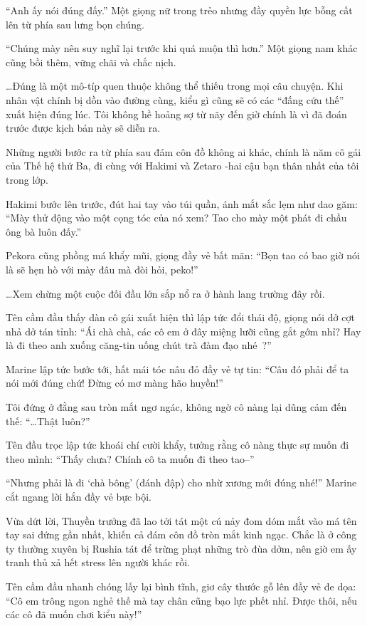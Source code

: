 \documentclass[../main.tex]{subfiles}
\begin{document}
``Anh ấy nói đúng đấy.'' Một giọng nữ trong trẻo nhưng đầy quyền lực bỗng cất lên từ phía sau lưng bọn chúng.

``Chúng mày nên suy nghĩ lại trước khi quá muộn thì hơn.'' Một giọng nam khác cũng bồi thêm, vững chãi và chắc nịch.

\dots Đúng là một mô-típ quen thuộc không thể thiếu trong mọi câu chuyện. Khi nhân vật chính bị dồn vào đường cùng, kiểu gì cũng sẽ có các ``đấng cứu thế'' xuất hiện đúng lúc. Tôi không hề hoảng sợ từ nãy đến giờ chính là vì đã đoán trước được kịch bản này sẽ diễn ra.

Những người bước ra từ phía sau đám côn đồ không ai khác, chính là năm cô gái của Thế hệ thứ Ba, đi cùng với Hakimi và Zetaro -hai cậu bạn thân nhất của tôi trong lớp.

Hakimi bước lên trước, đút hai tay vào túi quần, ánh mắt sắc lẹm như dao găm: ``Mày thử động vào một cọng tóc của nó xem? Tao cho mày một phát đi chầu ông bà luôn đấy.''

Pekora cũng phồng má khẩy mũi, giọng đầy vẻ bất mãn: ``Bọn tao có bao giờ nói là sẽ hẹn hò với mày đâu mà đòi hỏi, peko!''

\dots Xem chừng một cuộc đối đầu lớn sắp nổ ra ở hành lang trường đây rồi.

Tên cầm đầu thấy dàn cô gái xuất hiện thì lập tức đổi thái độ, giọng nói dở cợt nhả dở tán tỉnh: ``Ái chà chà, các cô em ở đây miệng lưỡi cũng gắt gớm nhỉ? Hay là đi theo anh xuống căng-tin uống chút trà đàm đạo nhé~?''

Marine lập tức bước tới, hất mái tóc nâu đỏ đầy vẻ tự tin: ``Câu đó phải để ta nói mới đúng chứ! Đừng có mơ màng hão huyền!''

Tôi đứng ở đằng sau tròn mắt ngơ ngác, không ngờ cô nàng lại dũng cảm đến thế: ``\dots Thật luôn?''

Tên đầu trọc lập tức khoái chí cười khẩy, tưởng rằng cô nàng thực sự muốn đi theo mình: ``Thấy chưa? Chính cô ta muốn đi theo tao--''

``Nhưng phải là đi `chà bông' (đánh đập) cho nhừ xương mới đúng nhé!'' Marine cắt ngang lời hắn đầy vẻ bực bội.

Vừa dứt lời, Thuyền trưởng đã lao tới tát một cú nảy đom dóm mắt vào má tên tay sai đứng gần nhất, khiến cả đám côn đồ tròn mắt kinh ngạc. Chắc là ở công ty thường xuyên bị Rushia tát để trừng phạt những trò đùa dởm, nên giờ em ấy tranh thủ xả hết stress lên người khác rồi.

Tên cầm đầu nhanh chóng lấy lại bình tĩnh, giơ cây thước gỗ lên đầy vẻ đe dọa: ``Cô em trông ngon nghẻ thế mà tay chân cũng bạo lực phết nhỉ. Được thôi, nếu các cô đã muốn chơi kiểu này!''
\end{document}
